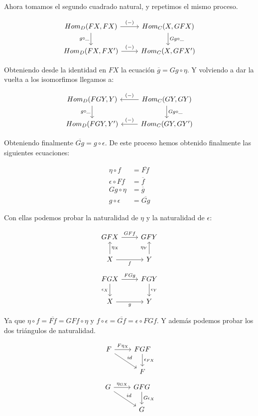 \documentclass[11pt]{article}
\begin{document}
Ahora tomamos el segundo cuadrado natural, y repetimos el mismo
proceso.

\[ \begin{tikzcd}
Hom_D(FX,FX) \arrow{d}[swap]{g \circ \_} \arrow{r}{(-)} & Hom_C(X,GFX) \arrow{d}{Gg\circ \_}\\
Hom_D(FX,FX') \arrow{r}{(-)}& Hom_C(X,GFX')
\end{tikzcd}
\] 

Obteniendo desde la identidad en $FX$ la ecuación $\overline{g} = Gg \circ \eta$. Y volviendo
a dar la vuelta a los isomorfimos llegamos a:

\[ \begin{tikzcd}
Hom_D(FGY,Y) \arrow{d}[swap]{g \circ \_}  & Hom_C(GY,GY) \arrow{l}[swap]{(-)} \arrow{d}{Gg \circ \_}\\
Hom_D(FGY,Y') & \arrow{l}[swap]{(-)} Hom_C(GY,GY')
\end{tikzcd}
\]

Obteniendo finalmente $\overline{Gg} = g \circ \epsilon$. De este proceso hemos obtenido finalmente
las siguientes ecuaciones:

\[ \begin{aligned}
\eta \circ f &= \overline{Ff} \\
\epsilon \circ Ff &= \overline{f} \\
Gg \circ \eta &= \overline{g} \\
g \circ  \epsilon &= \overline{Gg} 
\end{aligned} \]

Con ellas podemos probar la naturalidad de $\eta$ y la naturalidad de
$\epsilon$:

\[ \begin{tikzcd}
GFX  \arrow{r}{GFf} & GFY \\
X \arrow{u}[swap]{\eta_X} \arrow{r}[swap]{f} & Y \arrow{u}{\eta_Y}
\end{tikzcd}
\]   \[ \begin{tikzcd}
FGX \arrow{d}[swap]{\epsilon_X} \arrow{r}{FGg} & FGY \arrow{d}{\epsilon_Y}\\
X \arrow{r}[swap]{g} & Y
\end{tikzcd}
\]

Ya que $\eta \circ f = \overline{Ff} = GFf \circ \eta$ y $f \circ \epsilon = \overline{Gf} = \epsilon \circ FGf$. Y además podemos probar
los dos triángulos de naturalidad.

\[ \begin{tikzcd}
F \arrow{r}{F \eta_X} \arrow{dr}{id} & FGF \arrow{d}{\epsilon_{FX}} \\
 & F
\end{tikzcd}   
\]     \[ \begin{tikzcd}
G \arrow{r}{\eta_{GX}} \arrow{dr}{id} & GFG \arrow{d}{G\epsilon_X} \\
 & G
\end{tikzcd}
\]
\end{document}
